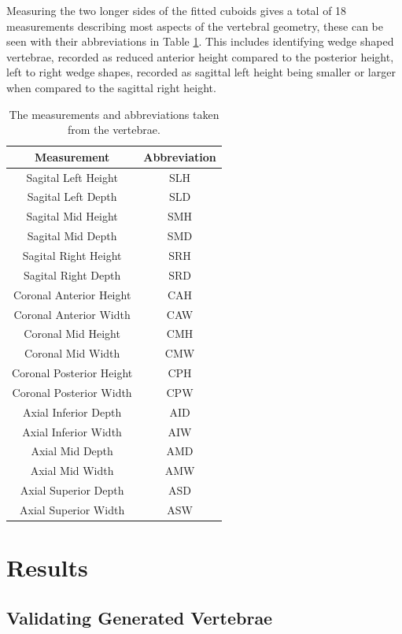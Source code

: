 Measuring the two longer sides of the fitted cuboids gives a total of 18
measurements describing most aspects of the vertebral geometry, these can be
seen with their abbreviations in Table \ref{tab:measurements}.  This includes
identifying wedge shaped vertebrae, recorded as reduced anterior height
compared to the posterior height, left to right wedge shapes, recorded as
sagittal left height being smaller or larger when compared to the sagittal right
height.

\begin{table}[ht!]
	\caption{The measurements and abbreviations taken from the vertebrae.}
	\label{tab:measurements}
	\centering
	\begin{tabular}{c|c}
    Measurement & Abbreviation \\
    \hline
    \hline
    Sagital Left Height & SLH \\
	Sagital Left Depth & SLD \\
    Sagital Mid Height & SMH \\
	Sagital Mid Depth & SMD \\
    Sagital Right Height & SRH \\
	Sagital Right Depth & SRD \\
	Coronal Anterior Height & CAH \\
	Coronal Anterior Width & CAW \\
	Coronal Mid Height & CMH \\
	Coronal Mid Width & CMW \\
	Coronal Posterior Height & CPH \\
	Coronal Posterior Width & CPW \\
	Axial Inferior Depth & AID \\
	Axial Inferior Width & AIW \\
	Axial Mid Depth & AMD \\
	Axial Mid Width & AMW \\
	Axial Superior Depth & ASD \\
	Axial Superior Width & ASW \\
	\hline
	\end{tabular}
\end{table}


\section{Results}

\subsection{Validating Generated Vertebrae} \label{sec:pca_val}

